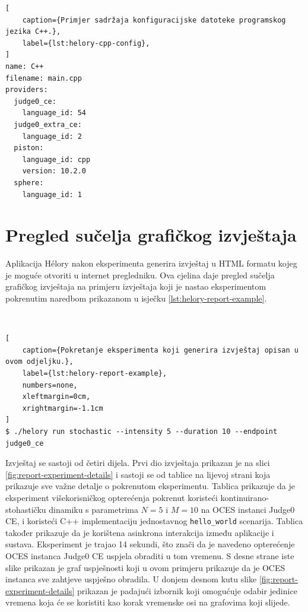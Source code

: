 \documentclass[times, utf8, diplomski]{fer}
\begin{document}
\pagebreak

\begin{lstlisting}[
    caption={Primjer sadržaja konfiguracijske datoteke programskog jezika C++.},
    label={lst:helory-cpp-config},
]
name: C++
filename: main.cpp
providers:
  judge0_ce:
    language_id: 54
  judge0_extra_ce:
    language_id: 2
  piston:
    language_id: cpp
    version: 10.2.0
  sphere:
    language_id: 1
\end{lstlisting}


\section{Pregled sučelja grafičkog izvještaja}
Aplikacija Hélory nakon eksperimenta generira izvještaj u HTML formatu kojeg je moguće otvoriti u internet pregledniku. Ova cjelina daje pregled sučelja grafičkog izvještaja na primjeru izvještaja koji je nastao eksperimentom pokrenutim naredbom prikazanom u isječku \ref{lst:helory-report-example}.

\

\begin{lstlisting}[
    caption={Pokretanje eksperimenta koji generira izvještaj opisan u ovom odjeljku.},
    label={lst:helory-report-example},
    numbers=none,
    xleftmargin=0cm,
    xrightmargin=-1.1cm
]
$ ./helory run stochastic --intensity 5 --duration 10 --endpoint judge0_ce
\end{lstlisting}

Izvještaj se sastoji od četiri dijela. Prvi dio izvještaja prikazan je na slici \ref{fig:report-experiment-details} i sastoji se od tablice na lijevoj strani koja prikazuje sve važne detalje o pokrenutom eksperimentu. Tablica prikazuje da je eksperiment višekorisničkog opterećenja pokrenut koristeći kontinuirano-stohastičku dinamiku s parametrima $N=5$ i $M=10$ na OCES instanci Judge0 CE, i koristeći C++ implementaciju jednostavnog \lstinline{hello_world} scenarija. Tablica također prikazuje da je korištena asinkrona interakcija između aplikacije i sustava. Eksperiment je trajao 14 sekundi, što znači da je navedeno opterećenje OCES instanca Judge0 CE uspjela obraditi u tom vremenu. S desne strane iste slike prikazan je graf uspješnosti koji u ovom primjeru prikazuje da je OCES instanca sve zahtjeve uspješno obradila. U donjem desnom kutu slike \ref{fig:report-experiment-details} prikazan je padajući izbornik  koji omogućuje odabir jedinice vremena koja će se koristiti kao korak vremenske osi na grafovima koji slijede.
\end{document}
